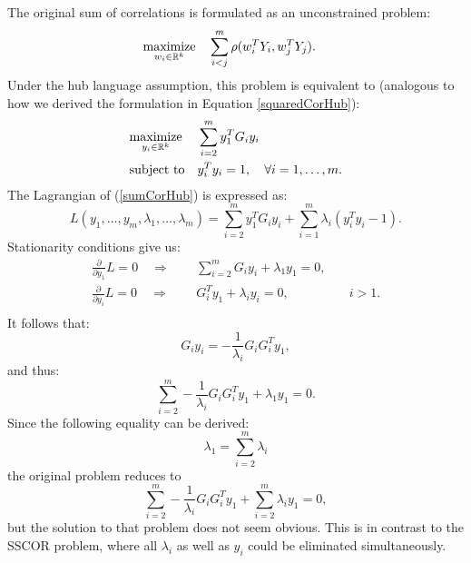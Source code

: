 The original sum of correlations is formulated as an unconstrained problem:
\begin{equation*}
  \begin{aligned}
    & \underset{w_i \in \mathbb{R}^{k}}{\text{maximize}}
    & & \sum_{i < j}^m  \rho(w_i^T Y_i, w_j^T Y_j).
\end{aligned}
\end{equation*}
Under the hub language assumption, this problem is equivalent to (analogous to how we derived the formulation in Equation \ref{squaredCorHub}):
\begin{equation}\label{sumCorHub}
  \begin{aligned}
    & \underset{y_i \in \mathbb{R}^{k}}{\text{maximize}}
    & & \sum_{i = 2}^m  y_1^T G_{i} y_i \\
    & \text{subject to}
    & & y_i^T y_i = 1, \quad\forall i = 1,\ldots, m.
\end{aligned}
\end{equation}
The Lagrangian of (\ref{sumCorHub}) is expressed as:
$$  L(y_1, \ldots, y_m, \lambda_1, \ldots, \lambda_m) =
\sum_{i = 2}^m  y_1^T G_{i} y_i + \sum_{i=1}^m \lambda_i \left(y_i^T y_i - 1\right).$$
Stationarity conditions give us:
\begin{equation}
\begin{aligned} \label{SUMCORdLdx}
  \frac{\partial}{\partial y_1} L = 0 \quad \Rightarrow \quad  &~ \sum_{i = 2}^m  G_i y_i + \lambda_1 y_1 =  0,& \\
  \frac{\partial}{\partial y_i} L = 0 \quad \Rightarrow \quad &~ G_{i}^T y_1 + \lambda_i y_i = 0,&\quad i > 1. \\
\end{aligned}
\end{equation}
It follows that:
$$
G_i y_i = -\frac{1}{\lambda_i} G_i G_i^T y_1,
$$
and thus:
$$
\sum_{i = 2}^m -\frac{1}{\lambda_i} G_i G_i^T y_1 + \lambda_1 y_1 = 0.
$$
Since the following equality can be derived:
$$\lambda_1 = \sum_{i = 2}^m \lambda_i$$
the original problem reduces to
$$
\sum_{i = 2}^m -\frac{1}{\lambda_i} G_i G_i^T y_1 + \sum_{i=2}^m \lambda_i y_1 = 0,
$$
but the solution to that problem does not seem obvious. This is in contrast to the SSCOR problem, where all $\lambda_i$ as
well as $y_i$ could be eliminated simultaneously.

